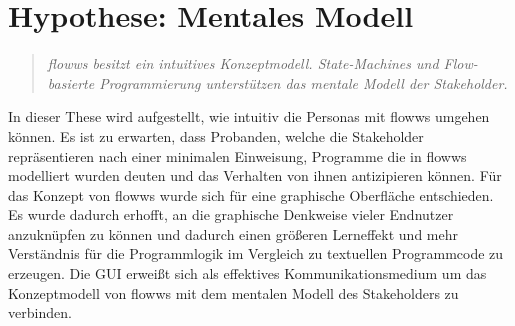 \section{Hypothese: Mentales Modell}\label{sec:hypothese}
\begin{quote}
    \textit{flowws besitzt ein intuitives Konzeptmodell. State-Machines und Flow-basierte Programmierung unterstützen das mentale Modell der Stakeholder.}
\end{quote}

In dieser These wird aufgestellt, wie intuitiv die Personas mit flowws umgehen können. Es ist zu erwarten, dass Probanden, welche die Stakeholder repräsentieren nach einer minimalen Einweisung, Programme die in flowws modelliert wurden deuten und das Verhalten von ihnen antizipieren können. Für das Konzept von flowws wurde sich für eine graphische Oberfläche entschieden. Es wurde dadurch erhofft, an die graphische Denkweise vieler Endnutzer anzuknüpfen zu können und dadurch einen größeren Lerneffekt und mehr Verständnis für die Programmlogik im Vergleich zu textuellen Programmcode zu erzeugen. Die \ac{GUI} erweißt sich als effektives Kommunikationsmedium um das Konzeptmodell von flowws mit dem mentalen Modell des Stakeholders zu verbinden.